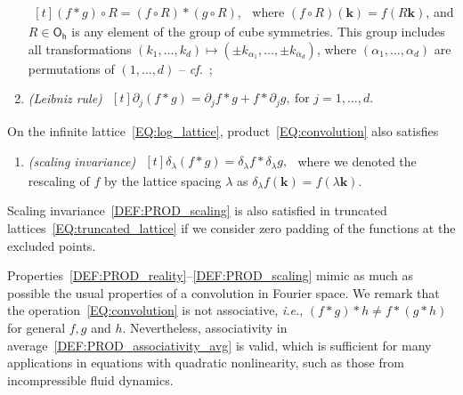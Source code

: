 \documentclass[12pt]{article}
\theoremstyle{definition}
\begin{document}
\begin{enumerate}[label=\textit{(P.\arabic*)}]
		$
		\!
		\begin{aligned}[t]
		(f\ast g) \circ R = (f \circ R) \ast (g \circ R),
		\end{aligned}
		$
		where $(f \circ R)(\mathbf{k}) = f(R\mathbf{k})$, and $R \in \mathsf{O_h}$ is any element of the group of cube symmetries. This group includes all transformations $(k_1,\dots,k_d) \mapsto (\pm k_{\alpha_1},\dots,\pm k_{\alpha_d})$, where $(\alpha_1,\dots,\alpha_d)$ are permutations of $(1,\dots,d)$ -- \textit{cf.}~\cite[Sec.~93]{landau2013quantum};
		\label{DEF:PROD_isotropy}
		\item \emph{(Leibniz rule)}
		$
		\!
		\begin{aligned}[t]
		\partial_j (f \ast g) = \partial_j f \ast g + f \ast \partial_j g, \ \text{for } j = 1,\dots,d.
		\end{aligned}
		$
		\label{DEF:PROD_leibniz}
	\end{enumerate}
	On the infinite lattice~\eqref{EQ:log_lattice}, product~\eqref{EQ:convolution} also satisfies
	\begin{enumerate}[label=\textit{(P.8)}] %
		\item \emph{(scaling invariance)}
		$
		\!
		\begin{aligned}[t]
		\delta_{\lambda}(f \ast g) = \delta_{\lambda} f \ast \delta_{\lambda} g,
		\end{aligned}
		$
		where we denoted the rescaling of $f$ by the lattice spacing $\lambda$ as $\delta_\lambda f (\mathbf{k}) = f(\lambda \mathbf{k})$.
		\label{DEF:PROD_scaling}
	\end{enumerate}
	Scaling invariance~\ref{DEF:PROD_scaling} is also satisfied in truncated lattices~\eqref{EQ:truncated_lattice} if we consider zero padding of the functions at the excluded points.
	
	Properties~\ref{DEF:PROD_reality}--\ref{DEF:PROD_scaling} mimic as much as possible the usual properties of a convolution in Fourier space.
	We remark that the operation~\eqref{EQ:convolution} is not associative, \textit{i.e.}, $(f\ast g) \ast h \neq f \ast (g \ast h)$ for general $f,g$ and $h$.
	Nevertheless, associativity in average~\ref{DEF:PROD_associativity_avg} is valid, which is sufficient for many applications in equations with quadratic nonlinearity, such as those from incompressible fluid dynamics.
	
\end{document}
